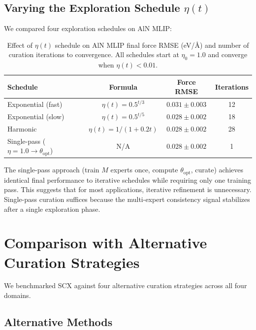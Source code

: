 \documentclass[11pt]{article}
\begin{document}
\subsection{Varying the Exploration Schedule $\eta(t)$}

We compared four exploration schedules on AlN MLIP:

\begin{table}[h]
\centering
\caption{Effect of $\eta(t)$ schedule on AlN MLIP final force RMSE (eV/\AA) and number of curation iterations to convergence. All schedules start at $\eta_0 = 1.0$ and converge when $\eta(t) < 0.01$.}
\label{tab:eta_schedule}
\begin{tabular}{lccc}
\hline
Schedule & Formula & Force RMSE & Iterations \\
\hline
Exponential (fast) & $\eta(t) = 0.5^{t/3}$ & $0.031 \pm 0.003$ & 12 \\
Exponential (slow) & $\eta(t) = 0.5^{t/5}$ & $0.028 \pm 0.002$ & 18 \\
Harmonic & $\eta(t) = 1/(1 + 0.2t)$ & $0.028 \pm 0.002$ & 28 \\
Single-pass ($\eta=1.0 \to \theta_{\text{opt}}$) & N/A & $0.028 \pm 0.002$ & 1 \\
\hline
\end{tabular}
\end{table}

The single-pass approach (train $M$ experts once, compute $\theta_{\text{opt}}$, curate) achieves identical final performance to iterative schedules while requiring only one training pass. This suggests that for most applications, iterative refinement is unnecessary. Single-pass curation suffices because the multi-expert consistency signal stabilizes after a single exploration phase.

\section{Comparison with Alternative Curation Strategies}

We benchmarked SCX against four alternative curation strategies across all four domains.

\subsection{Alternative Methods}
\end{document}
